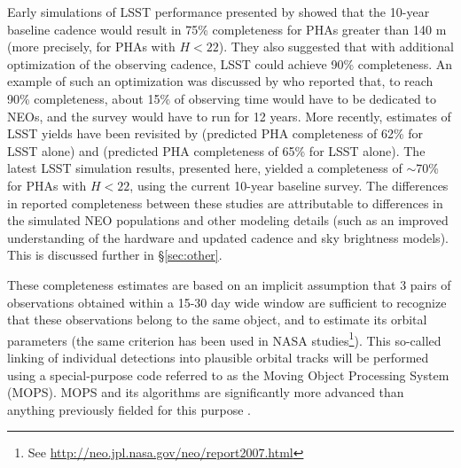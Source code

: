 Early simulations of LSST performance presented by \cite{IvezicNEO2007} showed that the 10-year baseline
cadence would result in 75\% completeness for PHAs greater than 140 m (more  precisely, for PHAs with
$H<22$). They also suggested that with additional optimization of the
observing cadence, LSST could achieve 90\% completeness. An example of such an optimization was discussed
by \cite{LSSToverview} who reported that, to reach 90\% completeness, about 15\% of observing time would
have to be dedicated to NEOs, and the survey would have to run for 12 years. More recently, estimates of
LSST yields have been revisited by \citet{GMS2016} (predicted PHA completeness of 62\% for LSST alone) and \citet{VeresChesley2017neo} (predicted PHA completeness of 65\% for LSST alone).
The latest LSST simulation results, presented here, yielded a completeness of $\sim$70\% for
PHAs with $H<22$, using the current 10-year baseline survey. The differences in reported completeness
between these studies are attributable to differences in the simulated NEO populations and other modeling
details (such as an improved understanding of the hardware and updated cadence and sky brightness models).
This is discussed further in \S\ref{sec:other}.

These completeness estimates are based on an implicit assumption that 3 pairs of observations
obtained within a 15-30 day wide window are sufficient to recognize that these observations belong
to the same object, and to estimate its orbital parameters (the same criterion has been used in NASA
studies\footnote{See \url{http://neo.jpl.nasa.gov/neo/report2007.html}}).
This so-called linking of individual detections into plausible orbital tracks
will be performed using a special-purpose code referred to as the Moving Object
Processing System (MOPS). MOPS and its algorithms are significantly more
advanced than anything previously fielded for this purpose \citep{denneau13}. 

